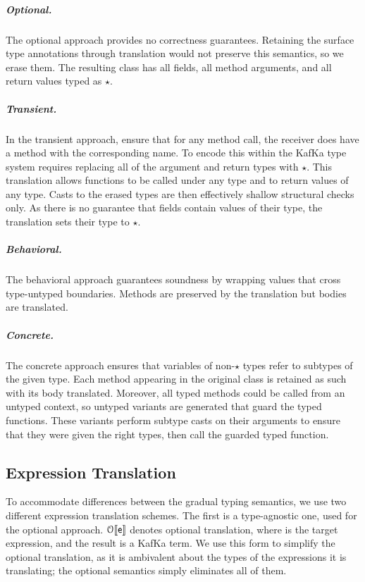 \documentclass[a4paper,UKenglish]{lipics-v2018}
\newcommand{\OTS}{{\mathcal{O}}}
\newcommand{\EM}[1]{\ensuremath{#1}\xspace}
\newcommand{\any}{\EM{\star}}
\newcommand{\kafka}{{\sf KafKa}\xspace}
\begin{document}
\subparagraph*{Optional.} The optional approach provides no
correctness guarantees. Retaining the surface type annotations through
translation would not preserve this semantics, so we erase them. The
resulting class has all fields, all method arguments, and all return
values typed as \any.

\subparagraph*{Transient.} In the transient approach, ensure
that for any method call, the receiver does have a method with the
corresponding name. To encode this within the \kafka type system requires
replacing all of the argument and return types with \any. This translation
allows functions to be called under any type and to return values of any
type. Casts to the erased types are then effectively shallow structural
checks only. As there is no
guarantee that fields contain values of their type,
the translation sets their type to \any.

\subparagraph*{Behavioral.} The behavioral approach guarantees
soundness by wrapping values that cross type-untyped boundaries. Methods
are preserved by the translation but bodies are translated.

\subparagraph*{Concrete.} The concrete approach ensures that
variables of non-\any types refer to subtypes of the given type. Each method
appearing in the original class is retained as such with its body
translated. Moreover, all typed methods could be called from an untyped
context, so untyped variants are generated that guard the typed functions.
These variants perform subtype casts on their arguments to ensure that they
were given the right types, then call the guarded typed function.

\subsection{Expression Translation} 

To accommodate differences between the gradual typing semantics, we use two
different expression translation schemes. The first is a type-agnostic
one, used for the optional approach. $\TR[\OTS]\e$ denotes optional translation,
where \e is the target expression, and the result is a \kafka term. We use
this form to simplify the optional translation, as it is ambivalent about the
types of the expressions it is translating; the optional semantics simply
eliminates all of them.
\end{document}
